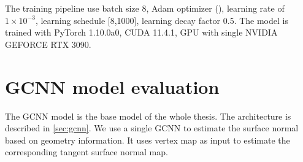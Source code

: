 \documentclass[border=15pt, multi, tikz]{article}
\begin{document}
The training pipeline use batch size $ 8 $,  Adam optimizer (\cite{adam}), learning rate of  $ 1\times10^{-3} $, learning schedule [8,1000], learning decay factor 0.5. 
The model is trained with PyTorch 1.10.0a0, CUDA 11.4.1, GPU with single NVIDIA GEFORCE RTX 3090. 


\section{GCNN model evaluation}
The GCNN model is the base model of the whole thesis. The architecture is described in \ref{sec:gcnn}. We use a single GCNN to estimate the surface normal based on geometry information. It uses vertex map as input to estimate the corresponding tangent surface normal map. 
\end{document}
